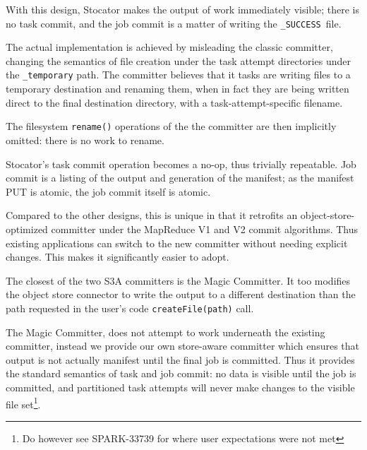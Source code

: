 \documentclass[conference]{IEEEtran}
\newcommand{\SUCCESS}{\texttt{\_SUCCESS}\ }
\newcommand{\TODO}{\emph{TODO}\ }
\begin{document}
With this design, Stocator makes the output of work immediately visible;
there is no task commit, and the job commit is a matter of writing
the \SUCCESS file.

The actual implementation is achieved by misleading the classic committer,
changing the semantics of file creation under the task attempt directories
under the \texttt{\_temporary} path.
The committer believes that it tasks are writing files to a temporary destination
and renaming them, when in fact they are being written direct to the final destination directory,
with a task-attempt-specific filename.

The filesystem \texttt{rename()} operations of the the committer are then implicitly
omitted: there is no work to rename.


Stocator's task commit operation becomes a no-op, thus trivially repeatable.
Job commit is a listing of the output and generation of the manifest;
as the manifest PUT is atomic, the job commit itself is atomic.

%

Compared to the other designs, this is unique in that it retrofits an
object-store-optimized committer under the MapReduce V1 and V2 commit algorithms.
Thus existing applications can switch to the new committer without needing
explicit changes.
This makes it significantly easier to adopt.


The closest of the two S3A committers is the Magic Committer.
It too modifies the object store connector to write the output to a
different destination than the path requested
in the user's code \texttt{createFile(path)} call.

The Magic Committer, does not attempt to work underneath the existing committer,
instead we provide our own store-aware committer
which ensures that output is not actually manifest until
the final job is committed.
Thus it provides the standard semantics of task and job commit: no data is
visible until the job is committed, and partitioned task attempts will
never make changes to the visible file set\footnote{Do however see SPARK-33739 for where user expectations were not met}.
\end{document}
